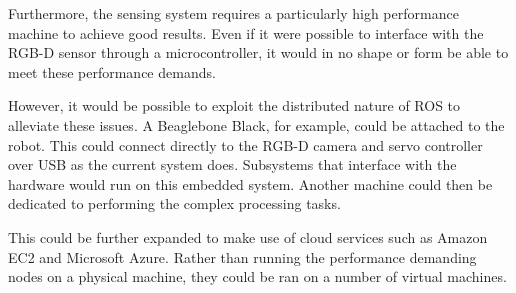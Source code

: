 Furthermore, the sensing system requires a particularly high performance machine to achieve good results. Even if it were possible to interface with the RGB-D sensor through a microcontroller, it would in no shape or form be able to meet these performance demands.

However, it would be possible to exploit the distributed nature of ROS to alleviate these issues. A Beaglebone Black, for example, could be attached to the robot. This could connect directly to the RGB-D camera and servo controller over USB as the current system does. Subsystems that interface with the hardware would run on this embedded system. Another machine could then be dedicated to performing the complex processing tasks.

This could be further expanded to make use of cloud services such as Amazon EC2 and Microsoft Azure. Rather than running the performance demanding nodes on a physical machine, they could be ran on a number of virtual machines. 